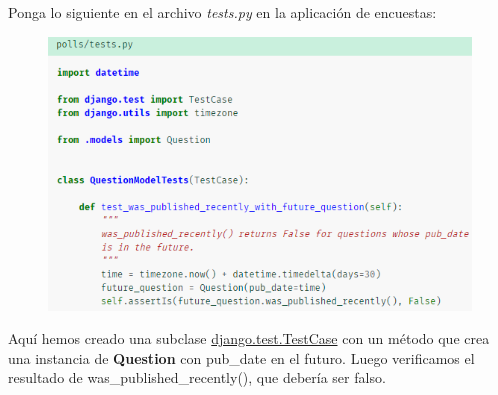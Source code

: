 \documentclass[10pt]{article}
\begin{document}
Ponga lo siguiente en el archivo \textit{tests.py} en la aplicación de encuestas:

\begin{figure}[H]
\begin{center}
\includegraphics[scale=1]{figuras/3/35/352/img2.png}
\end{center}
\end{figure}

Aquí hemos creado una subclase {\href{https://docs.djangoproject.com/en/3.0/topics/testing/tools/\#django.test.TestCase}{\textcolor{B}{django.test.TestCase}}} con un método que crea una instancia de \textbf{Question} con \textcolor{G}{pub\_date} en el futuro. Luego verificamos el resultado de \textcolor{G}{was\_published\_recently()}, que debería ser falso.
\end{document}
